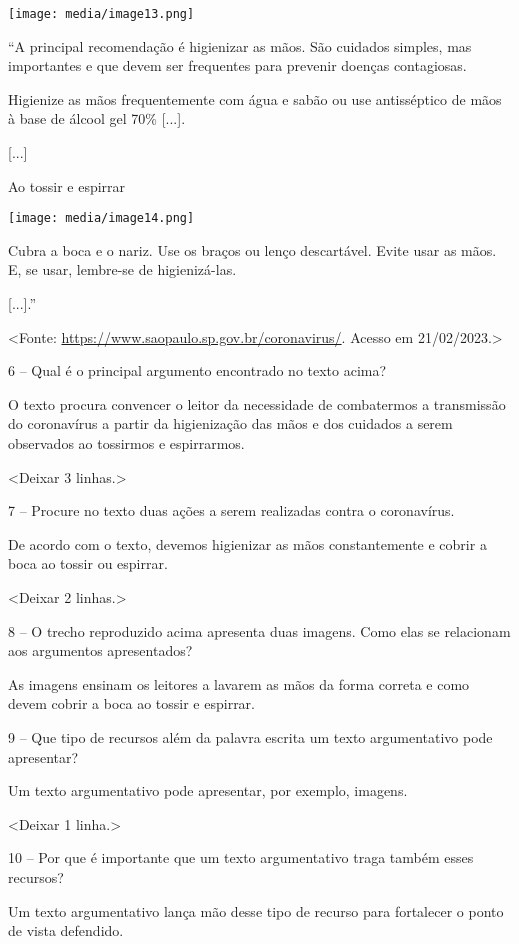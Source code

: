 \texttt{[image: media/image13.png]}

``A principal recomendação é higienizar as mãos. São cuidados simples,
mas importantes e que devem ser frequentes para prevenir doenças
contagiosas.

Higienize as mãos frequentemente com água e sabão ou use antisséptico de
mãos à base de álcool gel 70\% {[}...{]}.

{[}...{]}

Ao tossir e espirrar

\texttt{[image: media/image14.png]}

Cubra a boca e o nariz. Use os braços ou lenço descartável. Evite usar
as mãos. E, se usar, lembre-se de higienizá-las.

{[}...{]}.''

\textless{}Fonte: \url{https://www.saopaulo.sp.gov.br/coronavirus/}.
Acesso em 21/02/2023.\textgreater{}

6 -- Qual é o principal argumento encontrado no texto acima?

O texto procura convencer o leitor da necessidade de combatermos a
transmissão do coronavírus a partir da higienização das mãos e dos
cuidados a serem observados ao tossirmos e espirrarmos.

\textless{}Deixar 3 linhas.\textgreater{}

7 -- Procure no texto duas ações a serem realizadas contra o
coronavírus.

De acordo com o texto, devemos higienizar as mãos constantemente e
cobrir a boca ao tossir ou espirrar.

\textless{}Deixar 2 linhas.\textgreater{}

8 -- O trecho reproduzido acima apresenta duas imagens. Como elas se
relacionam aos argumentos apresentados?

As imagens ensinam os leitores a lavarem as mãos da forma correta e como
devem cobrir a boca ao tossir e espirrar.

9 -- Que tipo de recursos além da palavra escrita um texto argumentativo
pode apresentar?

Um texto argumentativo pode apresentar, por exemplo, imagens.

\textless{}Deixar 1 linha.\textgreater{}

10 -- Por que é importante que um texto argumentativo traga também esses
recursos?

Um texto argumentativo lança mão desse tipo de recurso para fortalecer o
ponto de vista defendido.

